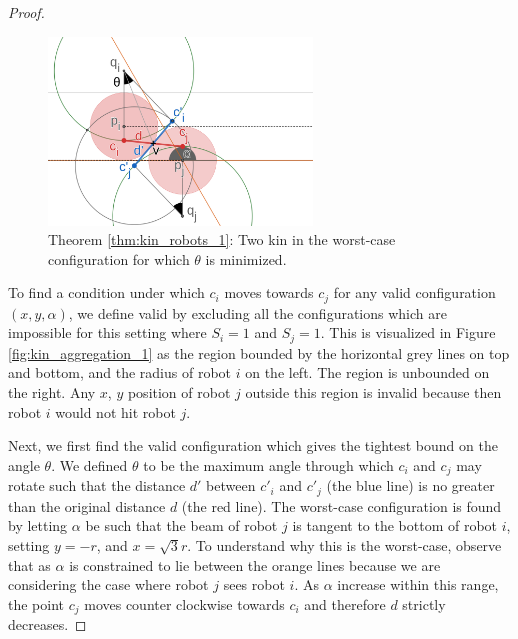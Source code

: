 \documentclass[letterpaper, 10 pt, conference]{ieeeconf}
\begin{document}
\begin{proof}
  \begin{figure}[t]
    \centering
    \includegraphics[height=5cm]{./images/kin_aggregation_1_worst_case.png}
    \caption{Theorem \ref{thm:kin_robots_1}: Two kin in the worst-case configuration for which $\theta$ is minimized.}
    \label{fig:kin_aggregation_1_worst_case}
  \end{figure}

  To find a condition under which $c_i$ moves towards $c_j$ for any valid configuration $(x,y,\alpha)$, we define valid by excluding all the configurations which are impossible for this setting where $S_i=1$ and $S_j=1$. This is visualized in Figure \ref{fig:kin_aggregation_1} as the region bounded by the horizontal grey lines on top and bottom, and the radius of robot $i$ on the left. The region is unbounded on the right. Any $x$, $y$ position of robot $j$ outside this region is invalid because then robot $i$ would not hit robot $j$.

  Next, we first find the valid configuration which gives the tightest bound on the angle $\theta$. We defined $\theta$ to be the maximum angle through which $c_i$ and $c_j$ may rotate such that the distance $d'$ between $c'_i$ and $c'_j$ (the blue line) is no greater than the original distance $d$ (the red line). The worst-case configuration is found by letting $\alpha$ be such that the beam of robot $j$ is tangent to the bottom of robot $i$, setting $y=-r$, and $x=\sqrt{3}r$. To understand why this is the worst-case, observe that as $\alpha$ is constrained to lie between the orange lines because we are considering the case where robot $j$ sees robot $i$. As $\alpha$ increase within this range, the point $c_j$ moves counter clockwise towards $c_i$ and therefore $d$ strictly decreases.


\end{proof}
\end{document}
